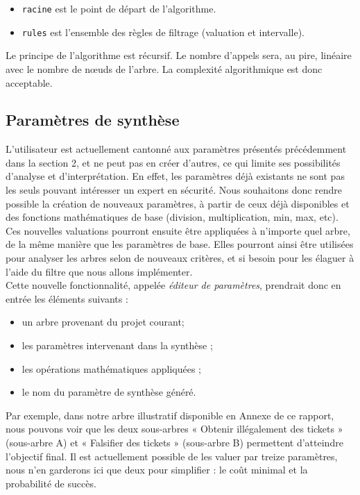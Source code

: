 		\begin{itemize}
		 \item \verb|racine| est le point de départ de l'algorithme.
		 \item \verb|rules| est l'ensemble des règles de filtrage (valuation et intervalle).
		\end{itemize}
	
		Le principe de l'algorithme est récursif.
		Le nombre d'appels sera, au pire, linéaire avec le nombre de nœuds de l'arbre.
		La complexité algorithmique est donc acceptable.

		\subsection{Paramètres de synthèse}
		\label{subsection:synthese} 

			L'utilisateur est actuellement cantonné aux paramètres présentés précédemment dans la section 2, et ne peut pas en créer d'autres, ce qui limite ses possibilités d'analyse et d'interprétation. En effet, les paramètres déjà existants ne sont pas les seuls pouvant intéresser un expert en sécurité. Nous souhaitons donc rendre possible la création de nouveaux paramètres, à partir de ceux déjà disponibles et des fonctions mathématiques de base (division, multiplication, min, max, etc). Ces nouvelles valuations pourront ensuite être appliquées à n'importe quel arbre, de la même manière que les paramètres de base. Elles pourront ainsi être utilisées pour analyser les arbres selon de nouveaux critères, et si besoin pour les élaguer à l'aide du filtre que nous allons implémenter.\\

			Cette nouvelle fonctionnalité, appelée \emph{éditeur de paramètres}, prendrait donc en entrée les éléments suivants :
			\begin{itemize}
				\item un arbre provenant du projet courant; %
				\item les paramètres intervenant dans la synthèse ;
				\item les opérations mathématiques appliquées ;
				\item le nom du paramètre de synthèse généré.
			\end{itemize}

			Par exemple, dans notre arbre illustratif disponible en Annexe de ce rapport, nous pouvons voir que les deux sous-arbres « Obtenir illégalement des tickets » (sous-arbre A) et « Falsifier des tickets » (sous-arbre B) permettent d'atteindre l'objectif final. Il est actuellement possible de les valuer par treize paramètres, nous n'en garderons ici que deux pour simplifier : le coût minimal et la probabilité de succès.\\ %

